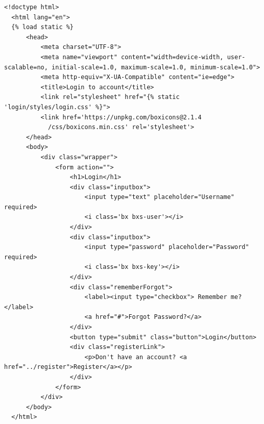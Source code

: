 \documentclass{article}
\begin{document}
\begin{lstlisting}[caption={templates/login.html}]
  <!doctype html>
  <html lang="en">
  {% load static %}
      <head>
          <meta charset="UTF-8">
          <meta name="viewport" content="width=device-width, user-scalable=no, initial-scale=1.0, maximum-scale=1.0, minimum-scale=1.0">
          <meta http-equiv="X-UA-Compatible" content="ie=edge">
          <title>Login to account</title>
          <link rel="stylesheet" href="{% static 'login/styles/login.css' %}">
          <link href='https://unpkg.com/boxicons@2.1.4
            /css/boxicons.min.css' rel='stylesheet'>
      </head>
      <body>
          <div class="wrapper">
              <form action="">
                  <h1>Login</h1>
                  <div class="inputbox">
                      <input type="text" placeholder="Username" required>
                      <i class='bx bxs-user'></i>
                  </div>
                  <div class="inputbox">
                      <input type="password" placeholder="Password" required>
                      <i class='bx bxs-key'></i>
                  </div>
                  <div class="rememberForgot">
                      <label><input type="checkbox"> Remember me?</label>
                      <a href="#">Forgot Password?</a>
                  </div>
                  <button type="submit" class="button">Login</button>
                  <div class="registerLink">
                      <p>Don't have an account? <a href="../register">Register</a></p>
                  </div>
              </form>
          </div>
      </body>
  </html>
\end{lstlisting}
\end{document}
